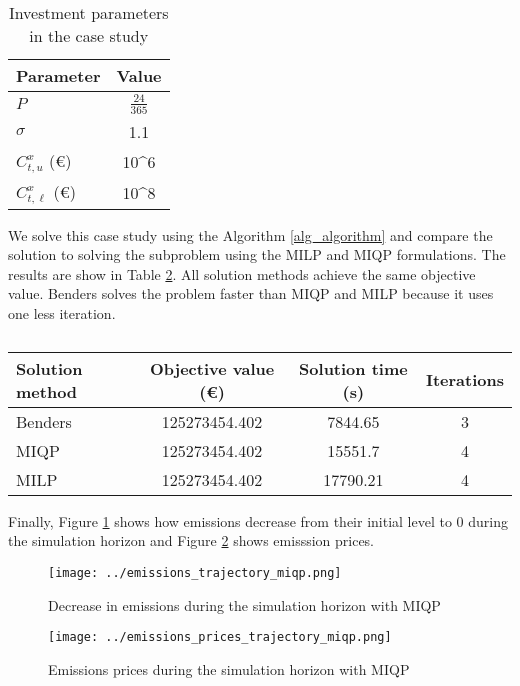 \documentclass[final]{IEEEtran}
\begin{document}
\begin{table}[htpb]
\centering
\begin{tabular}{l| c} \hline
Parameter 						& Value  \\ \hline
$P$ 									& $\frac{24}{365}$ \\
$\sigma$							& 1.1		\\
$C^x_{t, u}$ (€)			& 10^6    \\
$C^x_{t, \ell}$ (€)		& 10^8	\\
\end{tabular}
\caption{Investment parameters in the case study}
\label{table_investment_parameters}
\end{table}

We solve this case study using the Algorithm \ref{alg_algorithm} and compare the solution to solving the subproblem using the MILP and MIQP formulations. The results are show in Table \ref{table_results}. All solution methods achieve the same objective value. Benders solves the problem faster than MIQP and MILP because it uses one less iteration.

\begin{table}[htpb]
\centering
\begin{tabular}{l| c c c} \hline
Solution method 	& Objective value (€) 	& Solution time (s) & Iterations \\ \hline
Benders						& 125273454.402 				& 7844.65			& 3				 \\
MIQP							& 125273454.402					& 15551.7 		& 4     		 \\
MILP							& 125273454.402					& 17790.21		& 4				 \\
\end{tabular}
\caption{}
\label{table_results}
\end{table}

Finally, Figure \ref{fig_emissions_trajectory} shows how emissions decrease from their initial level to 0 during the simulation horizon and Figure \ref{fig_emissions_prices_trajectory} shows emisssion prices.

\begin{figure}[htpb]
  \centering
  \texttt{[image: ../emissions\_trajectory\_miqp.png]}
  \caption{Decrease in emissions during the simulation horizon with MIQP}
  \label{fig_emissions_trajectory}
\end{figure}

\begin{figure}[htpb]
  \centering
  \texttt{[image: ../emissions\_prices\_trajectory\_miqp.png]}
  \caption{Emissions prices during the simulation horizon with MIQP}
  \label{fig_emissions_prices_trajectory}
\end{figure}




\end{document}
